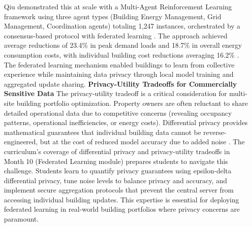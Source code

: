\documentclass[12pt,a4paper]{article}
\begin{document}
Qiu demonstrated this at scale with a Multi-Agent Reinforcement Learning framework using three agent types (Building Energy Management, Grid Management, Coordination agents) totaling 1,247 instances, orchestrated by a consensus-based protocol with federated learning \cite{ref47}. The approach achieved average reductions of 23.4\% in peak demand loads and 18.7\% in overall energy consumption costs, with individual building cost reductions averaging 16.2\% \cite{ref47}. The federated learning mechanism enabled buildings to learn from collective experience while maintaining data privacy through local model training and aggregated update sharing.
\textbf{Privacy-Utility Tradeoffs for Commercially Sensitive Data}
The privacy-utility tradeoff is a critical consideration for multi-site building portfolio optimization. Property owners are often reluctant to share detailed operational data due to competitive concerns (revealing occupancy patterns, operational inefficiencies, or energy costs). Differential privacy provides mathematical guarantees that individual building data cannot be reverse-engineered, but at the cost of reduced model accuracy due to added noise \cite{ref58}.
The curriculum's coverage of differential privacy and privacy-utility tradeoffs in Month 10 (Federated Learning module) prepares students to navigate this challenge. Students learn to quantify privacy guarantees using epsilon-delta differential privacy, tune noise levels to balance privacy and accuracy, and implement secure aggregation protocols that prevent the central server from accessing individual building updates. This expertise is essential for deploying federated learning in real-world building portfolios where privacy concerns are paramount.
\end{document}
